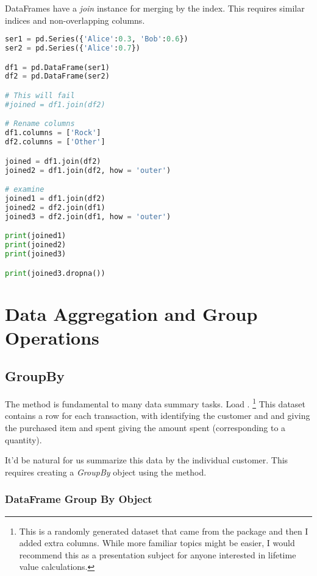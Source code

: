 DataFrames have a \emph{join} instance for merging by the index. This requires similar indices and non-overlapping columns.

\begin{lstlisting}[language = Python]
ser1 = pd.Series({'Alice':0.3, 'Bob':0.6})
ser2 = pd.Series({'Alice':0.7})

df1 = pd.DataFrame(ser1)
df2 = pd.DataFrame(ser2)

# This will fail
#joined = df1.join(df2)

# Rename columns
df1.columns = ['Rock']
df2.columns = ['Other']

joined = df1.join(df2)
joined2 = df1.join(df2, how = 'outer')

# examine 
joined1 = df1.join(df2)
joined2 = df2.join(df1)
joined3 = df2.join(df1, how = 'outer')

print(joined1)
print(joined2)
print(joined3)

print(joined3.dropna())
\end{lstlisting}



\section{Data Aggregation and Group Operations}

\subsection{GroupBy}
The  method is fundamental to many data summary tasks. Load .
\footnote{This is a randomly generated dataset that came from the  package and then I added extra columns. While more familiar topics might be easier, I would recommend this as a presentation subject for anyone interested in lifetime value calculations.} This dataset contains a row for each transaction, with  identifying the customer and  and  giving the purchased item and spent giving the amount spent (corresponding to a quantity). 

It'd be natural for us summarize this data by the individual customer. This requires creating a \emph{GroupBy} object using the  method. 

\subsubsection{DataFrame Group By Object}

